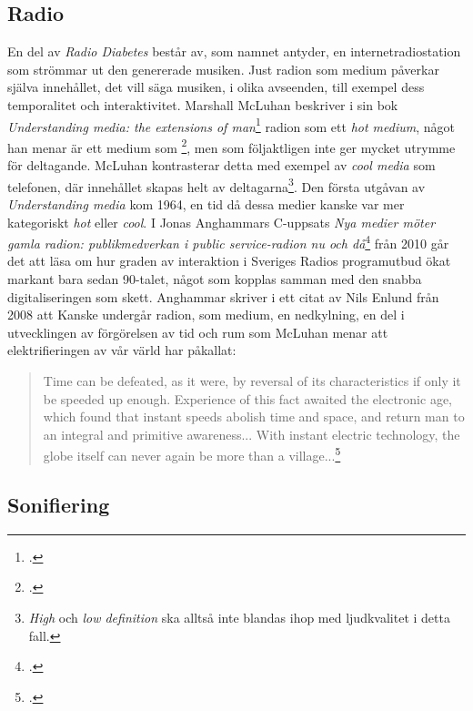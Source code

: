 \documentclass[11pt, a4paper]{article} %
\begin{document}
\subsection*{Radio}
En del av \emph{Radio Diabetes} består av, som namnet antyder, en internetradiostation som strömmar ut den genererade musiken. Just radion som medium påverkar själva innehållet, det vill säga musiken, i olika avseenden, till exempel dess temporalitet och interaktivitet. Marshall McLuhan beskriver i sin bok \emph{Understanding media: the extensions of man}\footcite{mcluhan_understanding_2003} radion som ett \emph{hot medium}, något han menar är ett medium som \footcite[39]{mcluhan_understanding_2003}, men som följaktligen inte ger mycket utrymme för deltagande. McLuhan kontrasterar detta med exempel av \emph{cool media} som telefonen, där innehållet skapas helt av deltagarna\footnote{\emph{High} och \emph{low definition} ska alltså inte blandas ihop med ljudkvalitet i detta fall.}. Den första utgåvan av \emph{Understanding media} kom 1964, en tid då dessa medier kanske var mer kategoriskt \emph{hot} eller \emph{cool}. I Jonas Anghammars C-uppsats \emph{Nya medier möter gamla radion: publikmedverkan i public service-radion nu och då}\footcite{anghammar_nya_2010} från 2010 går det att läsa om hur graden av interaktion i Sveriges Radios programutbud ökat markant bara sedan 90-talet, något som kopplas samman med den snabba digitaliseringen som skett. Anghammar skriver i ett citat av Nils Enlund från 2008 att  Kanske undergår radion, som medium, en nedkylning, en del i utvecklingen av förgörelsen av tid och rum som McLuhan menar att elektrifieringen av vår värld har påkallat: 
\begin{quote}Time can be defeated, as it were, by reversal of its characteristics if only it be speeded up enough. Experience of this fact awaited the electronic age, which found that instant speeds abolish time and space, and return man to an integral and primitive awareness... With instant electric technology, the globe itself can never again be more than a village...\footcite[ 206, 454]{mcluhan_understanding_2003}
\end{quote}

\subsection*{Sonifiering}
\end{document}
